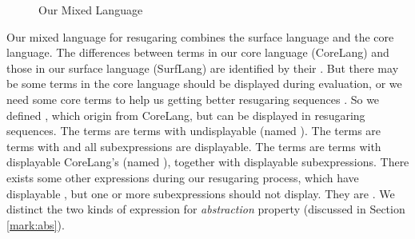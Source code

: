 \begin{figure}[thb]
\begin{centering}
	\framebox[36em][c]{
		\parbox[t]{33em}{
			\[
			\begin{array}{lcl}
			\m{Exp} &::=& \m{DisplayableExp}\\
			&|& \m{UndisplayableExp}\\
\\
			\m{DisplayableExp} &::=& \m{SurfExp}\\
			&|& \m{CommonExp}
\\
			\m{UndisplayableExp} &::=& \m{CoreExp'}\\
			&|& \m{OtherSurfExp}\\
			&|& \m{OtherCommonExp}\\
\\
			\m{CoreExp} &::=& \m{CoreExp'}\\
						 &|& \m{CommonExp}\\
\\
			\m{CoreExp'} &::=& (\m{CoreHead'}~\m{Exp}*)\\
\\
			\m{SurfExp} &::=& (\m{SurfHead}~\m{DisplayableExp}*)\\
\\
			\m{CommonExp} &::=& (\m{CommonHead}~\m{DisplayableExp}*)\\
			&|& c \qquad \note{// constant value}\\
			&|& x \qquad \note{// variable} \\
\\
			\m{OtherSurfExp} &::=& (\m{SurfHead}~\m{Exp}*~\m{UndisplayableExp}~\m{Exp}*)\\
\\
			\m{OtherCommonExp} &::=& (\m{CommonHead}~\m{Exp}*~\m{UndisplayableExp}~\m{Exp}*)
			\end{array}
			\]
		}
	}
\end{centering}
\caption{Our Mixed Language}
\label{fig:mix}
\end{figure}

Our mixed language for resugaring combines the surface language and the core language.
%
The differences between terms in our core language (CoreLang) and those in our surface language (SurfLang) are identified by their . But there may be some terms in the core language should be displayed during evaluation, or we need some core terms to help us getting better resugaring sequences . So we defined , which origin from CoreLang, but can be displayed in resugaring sequences. The  terms are terms with undisplayable  (named ). The  terms are terms with  and all subexpressions are displayable. The  terms are terms with displayable CoreLang's  (named ), together with displayable subexpressions. There exists some other expressions during our resugaring process, which have displayable , but one or more subexpressions should not display. They are . We distinct the two kinds of expression for \emph{abstraction} property (discussed in Section \ref{mark:abs}).


